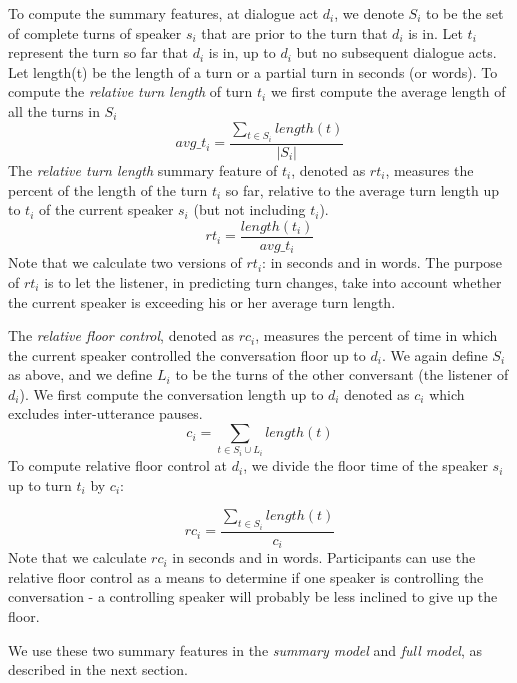      To compute the summary features, at dialogue act $d_i$, we denote $S_i$ to be the set of complete turns of speaker $s_i$ that are prior to the turn that $d_i$ is in.  Let $t_i$ represent the turn so far that $d_i$ is in, up to $d_i$ but no subsequent dialogue acts.  Let length(t) be the length of a turn or a partial turn in seconds (or words). To compute the \textit{relative turn length} of turn $t_i$ we first compute the average length of all the turns in $S_i$
%
    \begin{equation}
     avg\_t_i = \frac{\sum_{t \in S_i} length(t)}{|S_i|}
     \end{equation}
     The \textit{relative turn length} summary feature of $t_i$, denoted as $rt_i$, measures the percent of the length of the turn $t_i$ so far, relative to the average turn length up to $t_i$ of the current speaker $s_i$ (but not including $t_i$).
%
     \begin{equation}
            rt_i =  \frac{length(t_i)} {avg\_t_i}
     \end{equation}
     Note that we calculate two versions of $rt_i$: in seconds and in words.  The purpose of $rt_i$ is to let the listener, in predicting turn changes, take into account whether the current speaker is exceeding his or her average turn length.

     The \textit{relative floor control}, denoted as $rc_i$, measures the percent of time in which the current speaker controlled the conversation floor up to $d_i$. We again define $S_i$ as above, and we define $L_i$ to be the turns of the other conversant (the listener of $d_i$). We first compute the conversation length up to $d_i$ denoted as $c_i$ which excludes inter-utterance pauses.
     \begin{equation}
         c_i = \sum_{t \in S_i \cup L_i} length(t)
     \end{equation}
     To compute relative floor control at $d_i$, we divide the floor time of the speaker $s_i$ up to turn $t_i$ by $c_i$:

     \begin{equation}
        rc_i = \frac{\sum_{t \in S_i} length(t)} {c_i}
     \end{equation}
     Note that we calculate $rc_i$ in seconds and in words. Participants can use the relative floor control as a means to determine if one speaker is controlling the conversation - a controlling speaker will probably be less inclined to give up the floor.

     We use these two summary features in the \textit{summary model} and \textit{full model}, as described in the next section.


